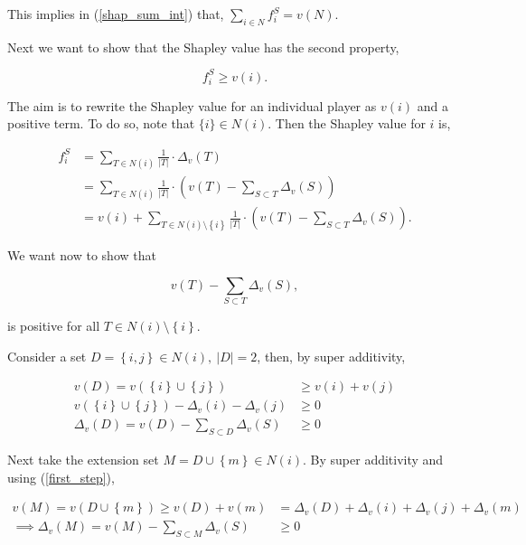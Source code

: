 \documentclass[american]{scrartcl}
\newcommand{\set}[1]{\left\{#1\right\}}
\newcommand{\abs}[1]{\left\lvert #1 \right\rvert}
\begin{document}
This implies in (\ref{shap_sum_int}) that, $\sum_{i \in N} f_i^S = v(N)$.



Next we want to show that the Shapley value has the second property,

\begin{equation}
    f_i^S \geq v(i).
\end{equation}

The aim is to rewrite the Shapley value for an individual player as $v(i)$ and a positive term. To do so, note that $\{i\} \in N(i)$. Then the Shapley value for $i$ is,

\begin{equation}
    \begin{split}
        f^S_i &= \sum_{T \in N(i)} \frac{1}{\abs{T}} \cdot \Delta_v(T)\\
        &=  \sum_{T \in N(i)} \frac{1}{\abs{T}} \cdot \left( v(T) - \sum_{S \subset T} \Delta_v(S) \right) \\
        &= v(i) + \sum_{T \in N(i) \setminus \set{i} } \frac{1}{\abs{T}} \cdot \left( v(T) - \sum_{S \subset T} \Delta_v(S) \right).
    \end{split}
\end{equation}

We want now to show that

\begin{equation} \label{diff}
    v(T) - \sum_{S \subset T} \Delta_v(S),
\end{equation}

is positive for all $T \in N(i) \setminus \set{i}$.

Consider a set $D = \set{i, j} \in N(i), \ \abs{D} = 2$, then, by super additivity,

\begin{equation} \label{first_step}
    \begin{split}
        v(D) = v\left( \set{i} \cup \set{j} \right) &\geq v(i) + v(j) \\
        v\left( \set{i} \cup \set{j} \right) - \Delta_v(i) - \Delta_v(j) &\geq 0 \\
        \Delta_v(D) = v(D) - \sum_{S \subset D} \Delta_v(S) &\geq 0
    \end{split}
\end{equation}

Next take the extension set $M = D \cup \set{m} \in N(i)$. By super additivity and using (\ref{first_step}),

\begin{equation} \label{second_step}
    \begin{split}
        v(M) = v(D \cup \set{m}) \geq v(D) + v(m) &= \Delta_v(D) + \Delta_v(i) + \Delta_v(j) + \Delta_v(m) \\
        \implies \Delta_v(M) =  v(M) - \sum_{S \subset M} \Delta_v(S) &\geq 0
    \end{split}
\end{equation}
\end{document}
